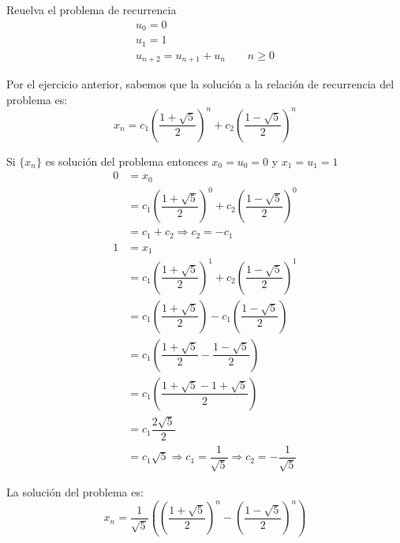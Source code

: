 \begin{ejercicio}
    Reuelva el problema de recurrencia 
    \begin{gather*}
        u_0 = 0\\    
        u_1 = 1 \\
        u_{n+2} = u_{n+1} + u_n \qquad n \geq 0
    \end{gather*}

    Por el ejercicio anterior, sabemos que la solución a la relación de recurrencia del problema es:
    \begin{equation*}
        x_n = c_1{\left(\dfrac{1+\sqrt{5}}{2}\right)}^n + c_2 {\left(\dfrac{1-\sqrt{5}}{2}\right)}^n
    \end{equation*}

    Si $\{x_n\}$ es solución del problema entonces $x_0 = u_0 = 0$ y $x_1 = u_1 = 1$
    \begin{align*}
        0 &= x_0 \\
          &= c_1{\left(\dfrac{1+\sqrt{5}}{2}\right)}^0 + c_2 {\left(\dfrac{1-\sqrt{5}}{2}\right)}^0\\
          &= c_1 + c_2 \Longrightarrow c_2 = -c_1
    \end{align*}
    \begin{align*}
        1 &= x_1 \\
          &= c_1 {\left(\dfrac{1+\sqrt{5}}{2}\right)}^1 + c_2 {\left(\dfrac{1-\sqrt{5}}{2}\right)}^1 \\
          &= c_1 \left(\dfrac{1+\sqrt{5}}{2}\right) - c_1 \left(\dfrac{1-\sqrt{5}}{2}\right) \\
          &= c_1 \left(\dfrac{1+\sqrt{5}}{2} - \dfrac{1-\sqrt{5}}{2}\right) \\
          &= c_1 \left(\dfrac{1+\sqrt{5}-1+\sqrt{5}}{2}\right) \\
          &= c_1 \dfrac{2\sqrt{5}}{2} \\
          &= c_1 \sqrt{5} \Longrightarrow c_1 = \dfrac{1}{\sqrt{5}} \Longrightarrow c_2 = -\dfrac{1}{\sqrt{5}}
    \end{align*}

    La solución del problema es:
    \begin{equation*}
    x_n = \dfrac{1}{\sqrt{5}}\left({\left(\dfrac{1+\sqrt{5}}{2}\right)}^n - {\left(\dfrac{1-\sqrt{5}}{2}\right)}^n\right)
    \end{equation*}
\end{ejercicio}

